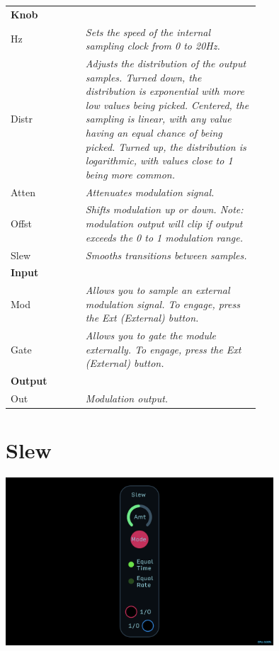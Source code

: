 \documentclass[11pt]{book}
\begin{document}
\begin{table}[ht]
\small
\sffamily
\renewcommand\arraystretch{1.5}
\centering
\begin{tabular}{l*{1}{>{\raggedright\arraybackslash}p{0.7\linewidth}}}

\toprule
\textbf{Knob} \\
Hz & \textit{Sets the speed of the internal sampling clock from 0 to 20Hz.} \\
Distr & \textit{Adjusts the distribution of the output samples. Turned down, the distribution is exponential with more low values being picked. Centered, the sampling is linear, with any value having an equal chance of being picked. Turned up, the distribution is logarithmic, with values close to 1 being more common.} \\
Atten & \textit{Attenuates modulation signal.} \\
Offst & \textit{Shifts modulation up or down. Note: modulation output will clip if output exceeds the 0 to 1 modulation range.} \\
Slew & \textit{Smooths transitions between samples.} \\

\midrule
\textbf{Input} \\
Mod & \textit{Allows you to sample an external modulation signal. To engage, press the Ext (External) button.} \\
Gate & \textit{Allows you to gate the module externally. To engage, press the Ext (External) button.} \\

\midrule
\textbf{Output} \\
Out & \textit{Modulation output.} \\

\bottomrule
\end{tabular}
\end{table}

\pagebreak


\section{Slew}

\begin{center}
\includegraphics[width=0.75\textwidth]{slew.png}
\end{center}
\end{document}
